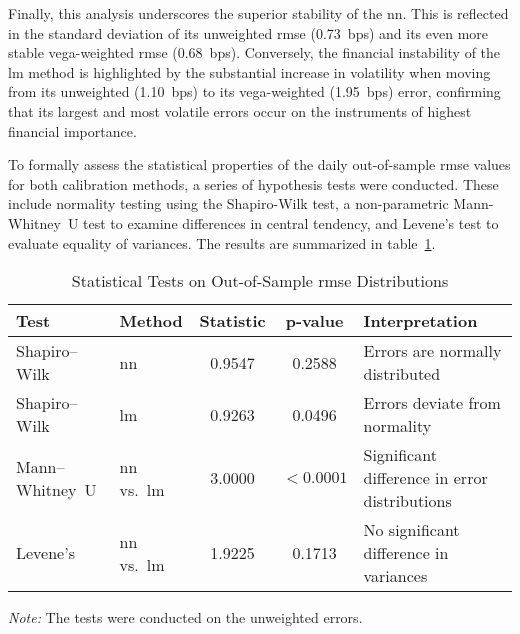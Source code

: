 Finally, this analysis underscores the superior stability of the \ac{nn}. This is reflected in the standard deviation of its unweighted \ac{rmse} (0.73~\ac{bps}) and its even more stable vega-weighted \ac{rmse} (0.68~\ac{bps}). Conversely, the financial instability of the \ac{lm} method is highlighted by the substantial increase in volatility when moving from its unweighted (1.10~\ac{bps}) to its vega-weighted (1.95~\ac{bps}) error, confirming that its largest and most volatile errors occur on the instruments of highest financial importance.

To formally assess the statistical properties of the daily out-of-sample \ac{rmse} values for both calibration methods, a series of hypothesis tests were conducted. These include normality testing using the Shapiro-Wilk test, a non-parametric Mann-Whitney~U test to examine differences in central tendency, and Levene's test to evaluate equality of variances. The results are summarized in table~\ref{tab:stat_tests}.

\begin{table}[htbp]
	\centering
	\begin{threeparttable}
		\caption{Statistical Tests on Out-of-Sample \ac{rmse} Distributions}
		\label{tab:stat_tests}
		\begin{tabular}{lp{2.5cm}ccp{3.5cm}}
			\toprule
			\textbf{Test}   & \textbf{Method}      & \textbf{Statistic} & \textbf{p-value} & \textbf{Interpretation}                       \\
			\midrule
			Shapiro--Wilk   & \ac{nn}              & 0.9547             & 0.2588           & Errors are normally distributed               \\
			Shapiro--Wilk   & \ac{lm}              & 0.9263             & 0.0496           & Errors deviate from normality                 \\
			Mann--Whitney~U & \ac{nn} vs.\ \ac{lm} & 3.0000             & $<0.0001$        & Significant difference in error distributions \\
			Levene's        & \ac{nn} vs.\ \ac{lm} & 1.9225             & 0.1713           & No significant difference in variances        \\
			\bottomrule
		\end{tabular}
		\begin{tablenotes}
			\footnotesize
			\item \textit{Note:} The tests were conducted on the unweighted errors.
		\end{tablenotes}
	\end{threeparttable}
\end{table}

